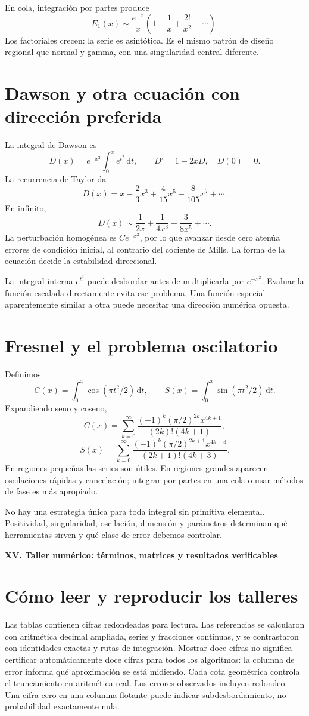 \documentclass[11pt,a4paper]{article}
\newcommand{\dd}{\,\mathrm d}
\theoremstyle{definition}
\newcommand{\parte}[1]{\par\bigskip\Needspace{8\baselineskip}\begin{center}{\Large\bfseries\color{azul}#1}\end{center}}
\newcounter{problema}
\begin{document}
En cola, integración por partes produce
\[
E_1(x)\sim\frac{e^{-x}}x
\left(1-\frac1x+\frac{2!}{x^2}-\cdots\right).
\]
Los factoriales crecen: la serie es asintótica. Es el mismo patrón de diseño regional que normal y gamma, con una singularidad central diferente.

\section{Dawson y otra ecuación con dirección preferida}
La integral de Dawson es
\[
D(x)=e^{-x^2}\int_0^xe^{t^2}\dd t,\qquad D'=1-2xD,\quad D(0)=0.
\]
La recurrencia de Taylor da
\[
D(x)=x-\frac23x^3+\frac4{15}x^5-\frac8{105}x^7+\cdots.
\]
En infinito,
\[
D(x)\sim\frac1{2x}+\frac1{4x^3}+\frac3{8x^5}+\cdots.
\]
La perturbación homogénea es $Ce^{-x^2}$, por lo que avanzar desde cero atenúa errores de condición inicial, al contrario del cociente de Mills. La forma de la ecuación decide la estabilidad direccional.

La integral interna $e^{t^2}$ puede desbordar antes de multiplicarla por $e^{-x^2}$. Evaluar la función escalada directamente evita ese problema. Una función especial aparentemente similar a otra puede necesitar una dirección numérica opuesta.

\section{Fresnel y el problema oscilatorio}
Definimos
\[
C(x)=\int_0^x\cos(\pi t^2/2)\dd t,\qquad
S(x)=\int_0^x\sin(\pi t^2/2)\dd t.
\]
Expandiendo seno y coseno,
\[
C(x)=\sum_{k=0}^\infty
\frac{(-1)^k(\pi/2)^{2k}x^{4k+1}}{(2k)!(4k+1)},
\]
\[
S(x)=\sum_{k=0}^\infty
\frac{(-1)^k(\pi/2)^{2k+1}x^{4k+3}}{(2k+1)!(4k+3)}.
\]
En regiones pequeñas las series son útiles. En regiones grandes aparecen oscilaciones rápidas y cancelación; integrar por partes en una cola o usar métodos de fase es más apropiado.

No hay una estrategia única para toda integral sin primitiva elemental. Positividad, singularidad, oscilación, dimensión y parámetros determinan qué herramientas sirven y qué clase de error debemos controlar.


\parte{XV. Taller numérico: términos, matrices y resultados verificables}
\section{Cómo leer y reproducir los talleres}
Las tablas contienen cifras redondeadas para lectura. Las referencias se calcularon con aritmética decimal ampliada, series y fracciones continuas, y se contrastaron con identidades exactas y rutas de integración. Mostrar doce cifras no significa certificar automáticamente doce cifras para todos los algoritmos: la columna de error informa qué aproximación se está midiendo.
Cada cota geométrica controla el truncamiento en aritmética real. Los errores observados incluyen redondeo. Una cifra cero en una columna flotante puede indicar subdesbordamiento, no probabilidad exactamente nula.
\end{document}
